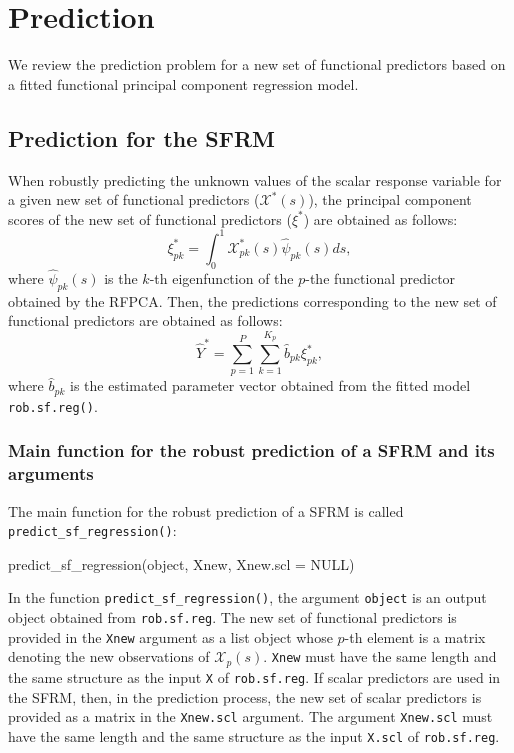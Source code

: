 \section*{Prediction}

We review the prediction problem for a new set of functional predictors based on a fitted functional principal component regression model.

\subsection*{Prediction for the SFRM}

When robustly predicting the unknown values of the scalar response variable for a given new set of functional predictors ($\mathcal{X}^*(s)$), the principal component scores of the new set of functional predictors ($\xi^*$) are obtained as follows:
\begin{equation*}
\xi_{pk}^* = \int_0^1 \mathcal{X}^*_{pk}(s) \widehat{\psi}_{pk}(s) ds,
\end{equation*}
where $\widehat{\psi}_{pk}(s)$ is the $k$-th eigenfunction of the $p$-the functional predictor obtained by the RFPCA. Then, the predictions corresponding to the new set of functional predictors are obtained as follows:
\begin{equation*}
\widehat{Y}^* = \sum_{p=1}^P \sum_{k=1}^{K_p} \widehat{b}_{pk} \xi_{pk}^*,
\end{equation*}
where $\widehat{b}_{pk}$ is the estimated parameter vector obtained from the fitted model \texttt{rob.sf.reg()}.

\subsubsection*{Main function for the robust prediction of a SFRM and its arguments}

The main function for the robust prediction of a SFRM is called \texttt{predict\_sf\_regression()}:
\begin{smallexample}
\begin{smallverbatim}
predict_sf_regression(object, Xnew, Xnew.scl = NULL)
\end{smallverbatim}
\end{smallexample}
In the function \texttt{predict\_sf\_regression()}, the argument \texttt{object} is an output object obtained from \texttt{rob.sf.reg}. The new set of functional predictors is provided in the \texttt{Xnew} argument as a list object whose $p$-th element is a matrix denoting the new observations of $\mathcal{X}_p(s)$. \texttt{Xnew} must have the same length and the same structure as the input \texttt{X} of \texttt{rob.sf.reg}. If scalar predictors are used in the SFRM, then, in the prediction process, the new set of scalar predictors is provided as a matrix in the \texttt{Xnew.scl} argument. The argument
\texttt{Xnew.scl} must have the same length and the same structure as the input \texttt{X.scl} of \texttt{rob.sf.reg}.

